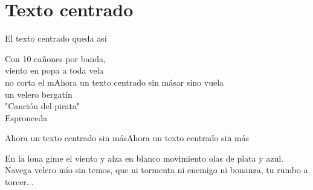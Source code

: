 \documentclass[10pt,a4paper]{report}
\begin{document}
\chapter{Texto centrado}
El texto centrado queda así
	\begin{center}
		Con 10 cañones por banda,\\
		viento en popa a toda vela \\
		no corta el mAhora un texto centrado sin másar sino vuela \\
		un velero bergatín 
		\vspace{1.5cm} \\
			"Canción del pirata" \\
			Espronceda
	\end{center}
	Ahora un texto centrado sin másAhora un texto centrado sin más
	\begin{center}
			En la lona gime el viento y alza en blanco movimiento olas de plata y azul. Navega velero mío sin temos, que ni tormenta ni enemigo ni bonanza, tu rumbo a torcer...	
	\end{center}
\end{document}
